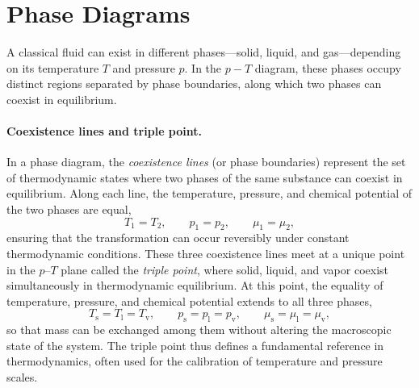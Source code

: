 \section{Phase Diagrams}

A classical fluid can exist in different phases—solid, liquid, and gas—depending on its temperature \(T\) and pressure \(p\). In the \(p-T\) diagram, these phases occupy distinct regions separated by phase boundaries, along which two phases can coexist in equilibrium.

\paragraph{Coexistence lines and triple point.}
In a phase diagram, the \textit{coexistence lines} (or phase boundaries) represent the set of thermodynamic states where two phases of the same substance can coexist in equilibrium. Along each line, the temperature, pressure, and chemical potential of the two phases are equal,
\[
    T_1 = T_2, \qquad p_1 = p_2, \qquad \mu_1 = \mu_2,
\]
ensuring that the transformation can occur reversibly under constant thermodynamic conditions.
These three coexistence lines meet at a unique point in the \(p\)--\(T\) plane called the \textit{triple point}, where solid, liquid, and vapor coexist simultaneously in thermodynamic equilibrium.
At this point, the equality of temperature, pressure, and chemical potential extends to all three phases,
\[
    T_\mathrm{s} = T_\mathrm{l} = T_\mathrm{v}, \qquad
    p_\mathrm{s} = p_\mathrm{l} = p_\mathrm{v}, \qquad
    \mu_\mathrm{s} = \mu_\mathrm{l} = \mu_\mathrm{v},
\]
so that mass can be exchanged among them without altering the macroscopic state of the system.
The triple point thus defines a fundamental reference in thermodynamics, often used for the calibration of temperature and pressure scales.

